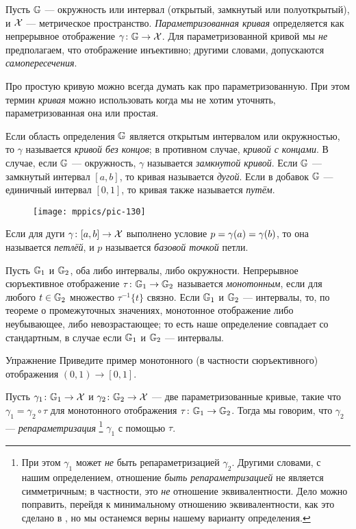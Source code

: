 Пусть $\mathbb{G}$ --- окружность или интервал (открытый, замкнутый или полуоткрытый), и $\mathcal{X}$ --- метрическое пространство.
\emph{Параметризованная кривая} определяется как непрерывное отображение $\gamma\colon\mathbb{G}\to\mathcal{X}$. 
Для параметризованной кривой мы \textit{не} предполагаем, что отображение инъективно; другими словами, допускаются {}\emph{самопересечения}.

Про простую кривую можно всегда думать как про параметризованную.
При этом термин \emph{кривая} можно использовать когда мы не хотим уточнять, параметризованная она или простая.

Если область определения $\mathbb{G}$ является открытым интервалом или окружностью, то $\gamma$ называется {}\emph{кривой без концов};
в противном случае, {}\emph{кривой с концами}.
В случае, если $\mathbb{G}$ --- окружность, $\gamma$ называется {}\emph{замкнутой кривой}. 
Если $\mathbb{G}$ --- замкнутый интервал $[a,b]$, то кривая называется \emph{дугой}.
Если в добавок $\mathbb{G}$ --- единичный интервал $[0,1]$, то кривая также называется \emph{путём}.

\begin{wrapfigure}{o}{15 mm}
\vskip-0mm
\centering
\texttt{[image: mppics/pic-130]}
\vskip-4mm
\end{wrapfigure}

Если для дуги $\gamma \colon [a,b] \to \mathcal{X}$ выполнено условие $p\z=\gamma (a)=\gamma (b)$, то она называется \emph{петлёй}, и $p$ называется \emph{базовой точкой} петли.

Пусть $\mathbb{G}_1$ и $\mathbb{G}_2$, оба либо интервалы, либо окружности.
Непрерывное сюръективное отображение $\tau\colon\mathbb{G}_1\to\mathbb{G}_2$ называется \emph{монотонным}, если для любого $t\in \mathbb{G}_2$ множество $\tau^{-1}\{t\}$ связно.
Если $\mathbb{G}_1$ и $\mathbb{G}_2$ --- интервалы, то, по теореме о промежуточных значениях, монотонное отображение либо неубывающее, либо невозрастающее;
то есть наше определение совпадает со стандартным, в случае если $\mathbb{G}_1$ и $\mathbb{G}_2$ --- интервалы.

\begin{thm}{Упражнение}\label{ex:mono}
Приведите пример монотонного (в частности сюръективного) отображения $(0,1)\to [0,1]$.
\end{thm}

Пусть $\gamma_1\colon\mathbb{G}_1\to \mathcal{X}$ и $\gamma_2\colon\mathbb{G}_2\to \mathcal{X}$ --- две параметризованные кривые, такие что 
$\gamma_1=\gamma_2\circ\tau$ для монотонного отображения $\tau\colon\mathbb{G}_1\to\mathbb{G}_2$.
Тогда мы говорим, что $\gamma_2$ --- \emph{репараметризация}%
\footnote{При этом $\gamma_1$ может \textit{не} быть репараметризацией $\gamma_2$.
Другими словами, с нашим определением, отношение \textit{быть репараметризацией} не является симметричным;
в частности, это \textit{не} отношение эквивалентности.
Дело можно поправить, перейдя к минимальному отношению эквивалентности, как это сделано в \cite[2.5.1]{burago-burago-ivanov},
но мы останемся верны нашему варианту определения.}
$\gamma_1$ с помощью $\tau$.


